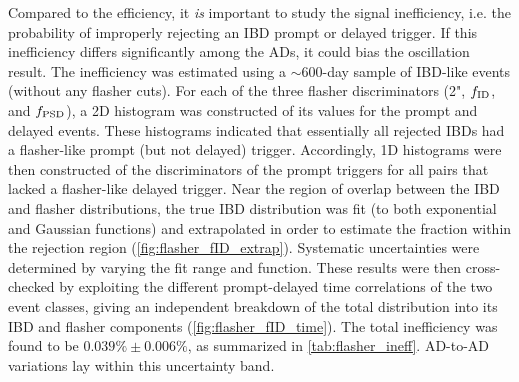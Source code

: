 \documentclass[../thesis.tex]{subfiles}
\begin{document}
Compared to the efficiency, it \emph{is} important to study the signal inefficiency, i.e. the probability of improperly rejecting an IBD prompt or delayed trigger. If this inefficiency differs significantly among the ADs, it could bias the oscillation result.
The inefficiency was estimated \cite{patrickFlashers} using a $\sim$600-day sample of IBD-like events (without any flasher cuts). For each of the three flasher discriminators (2", $f_{\mathrm{ID}}$, and $f_{\mathrm{PSD}}$), a 2D histogram was constructed of its values for the prompt and delayed events. These histograms indicated that essentially all rejected IBDs had a flasher-like prompt (but not delayed) trigger. Accordingly, 1D histograms were then constructed of the discriminators of the prompt triggers for all pairs that lacked a flasher-like delayed trigger. Near the region of overlap between the IBD and flasher distributions, the true IBD distribution was fit (to both exponential and Gaussian functions) and extrapolated in order to estimate the fraction within the rejection region (\autoref{fig:flasher_fID_extrap}). Systematic uncertainties were determined by varying the fit range and function. These results were then cross-checked by exploiting the different prompt-delayed time correlations of the two event classes, giving an independent breakdown of the total distribution into its IBD and flasher components (\autoref{fig:flasher_fID_time}). The total inefficiency was found to be $0.039\% \pm 0.006\%$, as summarized in \autoref{tab:flasher_ineff}. AD-to-AD variations lay within this uncertainty band.
\end{document}
